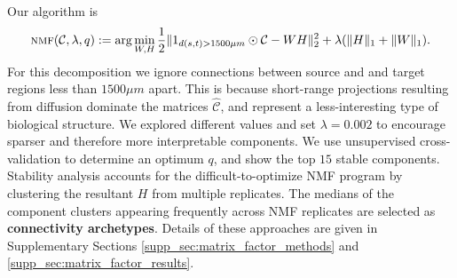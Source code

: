Our algorithm is 
\begin{eqnarray*}
\label{eq:nmf}
\textsc{nmf}(\mathcal C, \lambda, q) := \arg \min_{W, H} \frac{1}{2}\| 1_{d(s,t) > 1500 \mu m} \odot \mathcal C - WH\|_2^2  + \lambda  (\|H \|_1 + \|W \|_1) .
\end{eqnarray*}
For this decomposition we ignore connections between source and and target regions less than  $1500 \mu m$ apart.
This is because short-range projections resulting from diffusion dominate the matrices $\hat {\mathcal C}$, and represent a less-interesting type of biological structure.
We explored different values and set $\lambda = 0.002$ to encourage sparser and therefore more interpretable components.
We use unsupervised cross-validation to determine an optimum $q$, and show the top $15$ stable components.
Stability analysis accounts for the difficult-to-optimize NMF program by clustering the resultant $H$ from multiple replicates.
The medians of the component clusters appearing frequently across NMF replicates are selected as \textbf{connectivity archetypes}.
Details of these approaches are given in Supplementary Sections \ref{supp_sec:matrix_factor_methods} and \ref{supp_sec:matrix_factor_results}.



